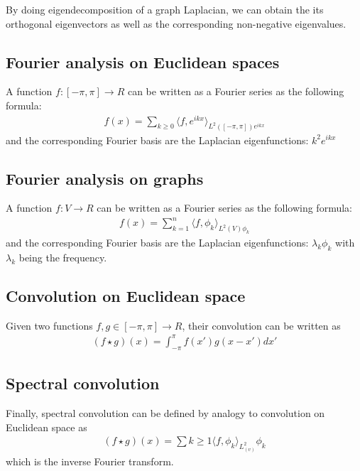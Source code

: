 By doing eigendecomposition of a graph Laplacian, we can obtain the its orthogonal eigenvectors as well as the corresponding non-negative eigenvalues.

\subsection{Fourier analysis on Euclidean spaces}
A function $f : [−π, π] → R$ can be written as a Fourier series as the following formula:
\begin{align} 
    f(x) = \sum_{k \geq 0} \langle f, e^{ikx} \rangle_{L^2([-\pi, \pi]) e^{ikx}}
\end{align}
and the corresponding Fourier basis are the Laplacian eigenfunctions: $k^2 e^{ikx}$


\subsection{Fourier analysis on graphs }
A function $f : V \to R$ can be written as a Fourier series as the following formula:
\begin{align} 
    f(x) = \sum_{k=1}^{n} \langle f, \phi_k \rangle_{L^2(V) \phi_k}
\end{align}
and the corresponding Fourier basis are the Laplacian eigenfunctions: $\lambda_k \phi_k$ with $\lambda_k$ being the frequency.

\subsection{Convolution on Euclidean space }
Given two functions $f, g \in [-\pi, \pi] \to R$, their convolution can be written as 
\begin{align} 
    (f \star g) (x) = \int_{-\pi}^{\pi} f(x') g(x-x') dx'
\end{align}

\subsection{Spectral convolution}
Finally, spectral convolution can be defined by analogy to convolution on Euclidean space as 
\begin{align} 
    (f \star g) (x) = \sum{k\geq 1} \langle f, \phi_k \rangle_{L^2_(v)}\phi_k
\end{align}
which is the inverse Fourier transform. 